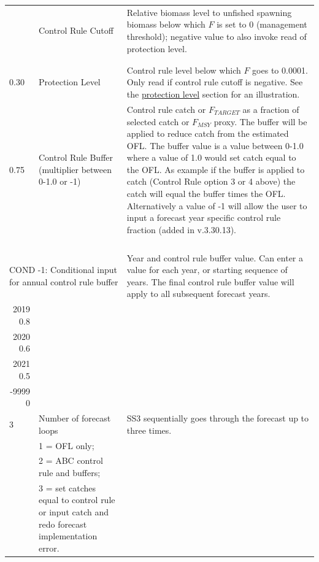 \begin{landscape}
{\begin{longtable}{p{2cm} p{7cm} p{12cm}}
  \pagebreak
  \hline
  0.10 \Tstrut & Control Rule Cutoff & \multirow{1}{1cm}[-0.2cm]{\parbox{12cm}{Relative biomass level to unfished spawning biomass below which $F$ is set to 0 (management threshold); negative value to also invoke read of protection level.}} \\
    & & \\
    & & \\

  \hline
  0.30 \Tstrut & Protection Level & Control rule level below which $F$ goes to 0.0001. Only read if control rule cutoff is negative. See the \hyperlink{ProtectionLevel}{protection level} section for an illustration. \Bstrut\\

  \hline
  0.75 \Tstrut & Control Rule Buffer (multiplier between 0-1.0 or -1) & \multirow{1}{1cm}[-0.25cm]{\parbox{12cm}{Control rule catch or $F_{TARGET}$ as a fraction of selected catch or $F_{MSY}$ proxy. The buffer will be applied to reduce catch from the estimated OFL. The buffer value is a value between 0-1.0 where a value of 1.0 would set catch equal to the OFL. As example if the buffer is applied to catch (Control Rule option 3 or 4 above) the catch will equal the buffer times the OFL. Alternatively a value of -1 will allow the user to input a forecast year specific control rule fraction (added in v.3.30.13).}} \Bstrut\\ 
    & & \Bstrut\\
    & & \Bstrut\\
    & & \Bstrut\\
    & & \Bstrut\\

  \hline
  \multicolumn{2}{l}{COND -1: Conditional input for annual control rule buffer} & \multirow{1}{1cm}[-0.25cm]{\parbox{12cm}{Year and control rule buffer value. Can enter a value for each year, or starting sequence of years. The final control rule buffer value will apply to all subsequent forecast years.}} \\
  \multicolumn{1}{r}{2019 0.8} & & \\
  \multicolumn{1}{r}{2020 0.6} & & \\ 
  \multicolumn{1}{r}{2021 0.5} & & \\ 
  \multicolumn{1}{r}{-9999 0} & & \\ 

  \hline
  3 \Tstrut & Number of forecast loops & \multirow{1}{1cm}[-0.25cm]{\parbox{12cm}{SS3 sequentially goes through the forecast up to three times.}} \\
    & 1 = OFL only; & \\
    & 2 = ABC control rule and buffers; & \\
    & 3 = set catches equal to control rule or input catch and redo forecast implementation error. & \Bstrut\\


\end{longtable}}
\end{landscape}
